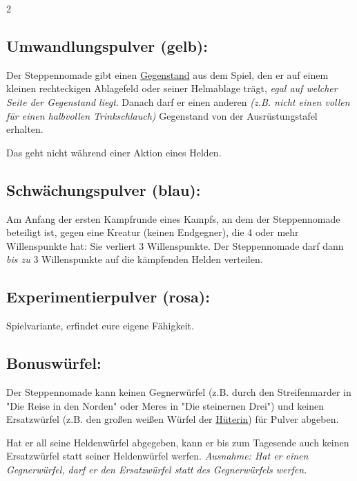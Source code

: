 \documentclass[10pt, a4paper, oneside]{book}
\newcommand{\fan}[1]{\textit{#1}}
\begin{document}
\begin{multicols*}{2}
\begin{nobgcolor}
\subsection{Umwandlungspulver (gelb):}

Der Steppennomade gibt einen \hyperref[Gegenstände und Sonderplättchen]{Gegenstand} aus dem Spiel, den er auf einem kleinen rechteckigen Ablagefeld oder seiner Helmablage trägt, \fan{egal auf welcher Seite der Gegenstand liegt}. Danach darf er einen anderen \fan{(z.B. nicht einen vollen für einen halbvollen Trinkschlauch)} Gegenstand von der Ausrüstungstafel erhalten. 
\supercite{MH:Pulver}

Das geht nicht während einer Aktion eines Helden.
\supercite{88552}




\subsection{Schwächungspulver (blau):}

Am Anfang der ersten Kampfrunde eines Kampfs, an dem der Steppennomade beteiligt ist, gegen eine Kreatur (keinen Endgegner\supercite{89624,90008}), die 4 oder mehr Willenspunkte hat\supercite{88552,89625}: Sie verliert 3 Willenspunkte. Der Steppennomade darf dann \fan{bis zu} 3 Willenspunkte auf die kämpfenden Helden verteilen. 
\supercite{MH:Pulver}






\subsection{Experimentierpulver (rosa):}

Spielvariante, erfindet eure eigene Fähigkeit.
\supercite{MH:Steppennomade,MH:Pulver,MH:Begleitheft}




\subsection{Bonuswürfel:}

Der Steppennomade kann keinen Gegnerwürfel (z.B. durch den Streifenmarder in "Die Reise in den Norden" oder Meres in "Die steinernen Drei") und keinen Ersatzwürfel (z.B. den großen weißen Würfel der \hyperref[Hüterin]{Hüterin}) für Pulver abgeben.

Hat er all seine Heldenwürfel abgegeben, kann er bis zum Tagesende auch keinen Ersatzwürfel statt seiner Heldenwürfel werfen.
\supercite{94520} 
\fan{Ausnahme: Hat er einen Gegnerwürfel, darf er den Ersatzwürfel statt des Gegnerwürfels werfen.}








\end{nobgcolor}
\end{multicols*}
\end{document}
